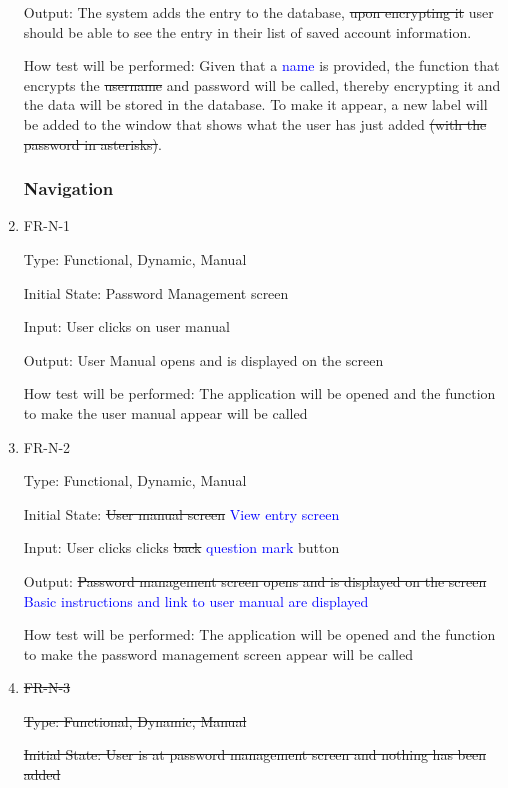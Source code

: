 \documentclass[12pt, titlepage]{article}
\begin{document}
\begin{enumerate}
Output: The system adds the entry to the database, \sout{upon encrypting it} user should be able to see the entry in their list of saved account information.

How test will be performed: Given that a \textcolor{blue}{name} is provided, the function that encrypts the \sout{username} and password will be called, thereby encrypting it and the data will be stored in the database. To make it appear, a new label will be added to the window that shows what the user has just added \sout{(with the password in asterisks)}.

\subsubsection{Navigation}

\item{FR-N-1\\}

Type: Functional, Dynamic, Manual

Initial State: Password Management screen

Input: User clicks on user manual

Output: User Manual opens and is displayed on the screen

How test will be performed: The application will be opened and the function to make the user manual appear will be called

\item{FR-N-2\\}

Type: Functional, Dynamic, Manual

Initial State: \sout{User manual screen} \textcolor{blue}{View entry screen}

Input: User clicks clicks \sout{back} \textcolor{blue}{question mark} button

Output: \sout{Password management screen opens and is displayed on the screen} \textcolor{blue}{Basic instructions and link to user manual are displayed}

How test will be performed: The application will be opened and the function to make the password management screen appear will be called

\item{\sout{FR-N-3}\\}

\sout{Type: Functional, Dynamic, Manual}

\sout{Initial State: User is at password management screen and nothing has been added}


\end{enumerate}
\end{document}
